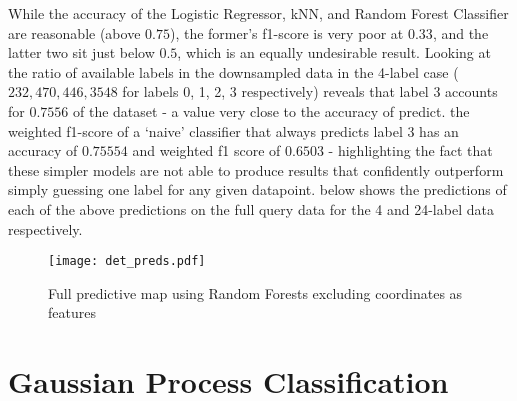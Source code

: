 While the accuracy of the Logistic Regressor, kNN, and Random Forest Classifier are reasonable (above $0.75$), the former's f1-score is very poor at $0.33$, and the latter two sit just below $0.5$, which is an equally undesirable result. Looking at the ratio of available labels in the downsampled data in the 4-label case ($232,  470,  446, 3548$ for labels 0, 1, 2, 3 respectively) reveals that label 3 accounts for $0.7556$ of the dataset - a value very close to the accuracy of predict. the weighted f1-score of a `naive' classifier that always predicts label 3 has an accuracy of  $0.75554$ and weighted f1 score of $0.6503$ - highlighting the fact that these simpler models are not able to produce results that confidently outperform simply guessing one label for any given datapoint.  below shows the predictions of each of the above predictions on the full query data for the 4 and 24-label data respectively.

\begin{figure}[H]
    \texttt{[image: det\_preds.pdf]}
    \caption{Full predictive map using Random Forests excluding coordinates as features}
    \label{fig:det4maps}
\end{figure}

\section{Gaussian Process Classification}



